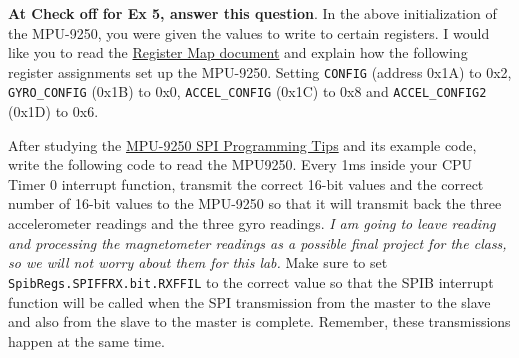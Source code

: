 \documentclass[11pt]{article}
\begin{document}
%
\textbf{At Check off for Ex 5, answer this question}. In the above initialization of the MPU-9250, you were given the values to write to certain registers. I would like you to read the \href{http://coecsl.ece.illinois.edu/se423/MPU-9250-Register-Map.pdf}{Register Map document} and explain how the following register assignments set up the MPU-9250. Setting \texttt{CONFIG} (address 0x1A) to 0x2, \texttt{GYRO_CONFIG} (0x1B) to 0x0, \texttt{ACCEL_CONFIG} (0x1C) to 0x8 and \texttt{ACCEL_CONFIG2} (0x1D) to 0x6.

After studying the \href{http://coecsl.ece.illinois.edu/se423/MPU-9250-Addendum.pdf}{MPU-9250 SPI Programming Tips} and its example code, write the following code to read the MPU9250. Every 1ms inside your CPU Timer 0 interrupt function, transmit the correct 16-bit values and the correct number of 16-bit values to the MPU-9250 so that it will transmit back the three accelerometer readings and the three gyro readings. \textit{I am going to leave reading and processing the magnetometer readings as a possible final project for the class, so we will not worry about them for this lab.}  Make sure to set \texttt{SpibRegs.SPIFFRX.bit.RXFFIL} to the correct value so that the SPIB interrupt function will be called when the SPI transmission from the master to the slave and also from the slave to the master is complete. Remember, these transmissions happen at the same time.
\end{document}
